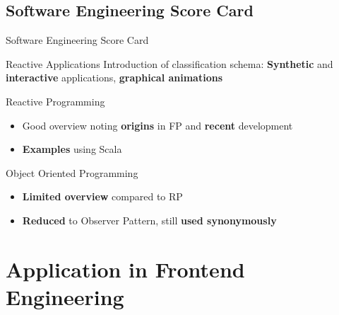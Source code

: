 \documentclass{beamer}
\begin{document}
\subsection*{Software Engineering Score Card}
\begin{frame}{Software Engineering Score Card}
	\begin{exampleblock}{Reactive Applications}
		Introduction of classification schema: \textbf{Synthetic} and \textbf{interactive} applications, \textbf{graphical animations}
	\end{exampleblock}
	\begin{exampleblock}{Reactive Programming}
		\begin{itemize}
			\item Good overview noting \textbf{origins} in FP and \textbf{recent} development
			\item \textbf{Examples} using Scala
		\end{itemize}
	\end{exampleblock}

	\begin{alertblock}{Object Oriented Programming}
		\begin{itemize}
			\item \textbf{Limited overview} compared to RP
			\item \textbf{Reduced} to Observer Pattern, still \textbf{used synonymously}
		\end{itemize}
	\end{alertblock}
\end{frame}



\section{Application in Frontend Engineering}
\end{document}
